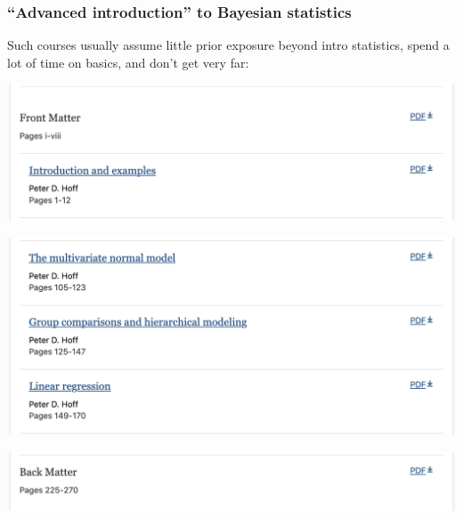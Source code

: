 \documentclass[18pt]{beamer}
\begin{document}
\begin{frame}
\frametitle{``Advanced introduction'' to Bayesian statistics}

\vspace*{-.5\baselineskip}

Such courses usually assume little prior exposure beyond intro statistics, spend a lot of time on basics, and don't get very far:
 
{\centering

\includegraphics[width=.6\linewidth]{Figure/hoff_toc_head}

\includegraphics[width=.6\linewidth]{Figure/hoff_toc_middle}

\includegraphics[width=.6\linewidth]{Figure/hoff_toc_foot}

}
\end{frame}
\end{document}
